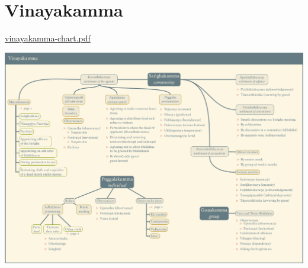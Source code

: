 \section{Vinayakamma}

\href{./includes/docs/vinayakamma-chart.pdf}{vinayakamma-chart.pdf}

\href{./includes/docs/vinayakamma-chart.pdf}{\includegraphics{./includes/docs/vinayakamma-chart-thumb.png}}

